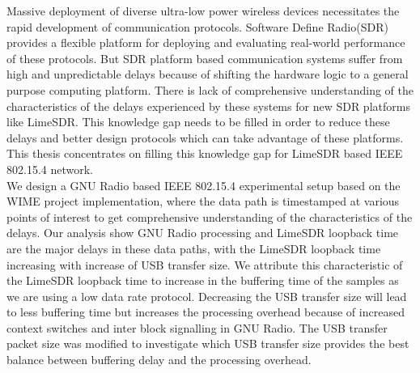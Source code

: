 Massive deployment of diverse ultra-low power wireless devices necessitates the rapid development of communication protocols.
Software Define Radio(SDR) provides a flexible platform for deploying and evaluating real-world performance of these protocols.
But SDR platform based communication systems suffer from high and unpredictable delays because of shifting the hardware logic to a general purpose computing platform.
There is lack of comprehensive understanding of the characteristics of the delays experienced by these systems for new SDR platforms like LimeSDR.
This knowledge gap needs to be filled in order to reduce these delays and better design protocols which can take advantage of these platforms.
This thesis concentrates on filling this knowledge gap for LimeSDR based IEEE 802.15.4 network.\\

We design a GNU Radio based IEEE 802.15.4 experimental setup based on the WIME project implementation, where the data path is timestamped at various points of interest to get comprehensive understanding of the characteristics of the delays.
Our analysis show GNU Radio processing and LimeSDR loopback time are the major delays in these data paths, with the LimeSDR loopback time increasing with increase of USB transfer size.
We attribute this characteristic of the LimeSDR loopback time to increase in the buffering time of the samples as we are using a low data rate protocol.
Decreasing the USB transfer size will lead to less buffering time but increases the processing overhead because of increased context switches and inter block signalling in GNU Radio.
The USB transfer packet size was modified to investigate which USB transfer size provides the best balance between buffering delay and the processing overhead.\\

